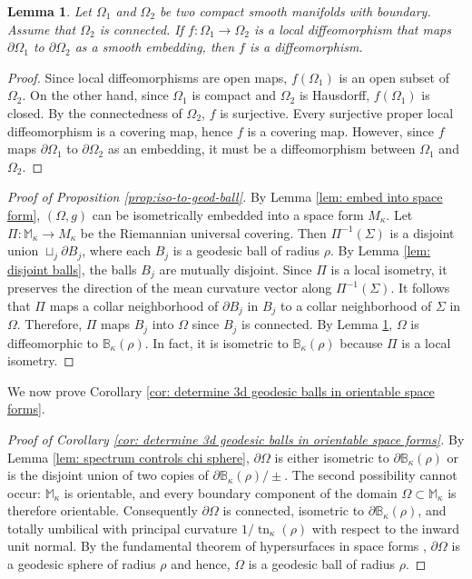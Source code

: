 \documentclass[11pt]{amsart}
\newcommand{\tn}{\operatorname{tn}}
\newtheorem{lemma}[theorem]{Lemma}
\theoremstyle{definition}
\numberwithin{equation}{section}
\begin{document}
\begin{lemma}
    \label{lem: local diffeomorphism implies diffeomorphism}
    Let $\Omega_1$ and $\Omega_2$ be two compact smooth manifolds with boundary. Assume that $\Omega_2$ is connected. If $f:\Omega_1\to\Omega_2$ is a local diffeomorphism that maps $\partial\Omega_1$ to $\partial\Omega_2$ as a smooth embedding, then $f$ is a diffeomorphism.
\end{lemma}
\begin{proof}
    Since local diffeomorphisms are open maps, $f(\Omega_1)$ is an open subset of $\Omega_2$. On the other hand, since $\Omega_1$ is compact and $\Omega_2$ is Hausdorff, $f(\Omega_1)$ is closed. By the connectedness of $\Omega_2$, $f$ is surjective. Every surjective proper local diffeomorphism is a covering map, hence $f$ is a covering map. However, since $f$ maps $\partial\Omega_1$ to $\partial\Omega_2$ as an embedding, it must be a diffeomorphism between $\Omega_1$ and $\Omega_2$.
\end{proof}

\begin{proof}[Proof of Proposition \ref{prop:iso-to-geod-ball}] 
    By Lemma \ref{lem: embed into space form}, $(\Omega,g)$ can be isometrically embedded into a space form $M_\kappa$. Let $\Pi:\mathbb M_\kappa\to M_\kappa$ be the Riemannian universal covering. Then $\Pi^{-1}(\Sigma)$ is a disjoint union $\sqcup_j \partial B_j$, where each $B_j$ is a geodesic ball of radius $\rho$. By Lemma \ref{lem: disjoint balls}, the balls $B_j$ are mutually disjoint. Since $\Pi$ is a local isometry, it preserves the direction of the mean curvature vector along $\Pi^{-1}(\Sigma)$. It follows that $\Pi$ maps a collar neighborhood of $\partial B_j$ in $B_j$ to a collar neighborhood of $\Sigma$ in $\Omega$. Therefore, $\Pi$ maps $B_j$ into $\Omega$ since $B_j$ is connected. By Lemma \ref{lem: local diffeomorphism implies diffeomorphism},  $\Omega$ is diffeomorphic to $\mathbb B_\kappa(\rho)$. In fact, it is isometric to $\mathbb B_\kappa(\rho)$ because $\Pi$ is a local isometry. 
\end{proof} 

We now prove Corollary \ref{cor: determine 3d geodesic balls in orientable space forms}.
\begin{proof}[Proof of Corollary \ref{cor: determine 3d geodesic balls in orientable space forms}]
By Lemma \ref{lem: spectrum controls chi sphere}, $\partial\Omega$ is either isometric to $\partial\mathbb B_\kappa(\rho)$ or is the disjoint union of two copies of $\partial\mathbb B_\kappa(\rho)/\pm$. The second possibility cannot occur: $\mathbb M_\kappa$ is orientable, and every boundary component of the domain $\Omega\subset\mathbb M_\kappa$ is therefore orientable. Consequently $\partial\Omega$ is connected, isometric to $\partial\mathbb B_\kappa(\rho)$, and totally umbilical with principal curvature $1/\tn_\kappa(\rho)$ with respect to the inward unit normal. By the fundamental theorem of hypersurfaces in space forms \cite[Theorem 20]{spivak1970comprehensive}, $\partial\Omega$ is a geodesic sphere of radius $\rho$ and hence, $\Omega$ is a geodesic ball of radius $\rho$. 
\end{proof}
\end{document}
